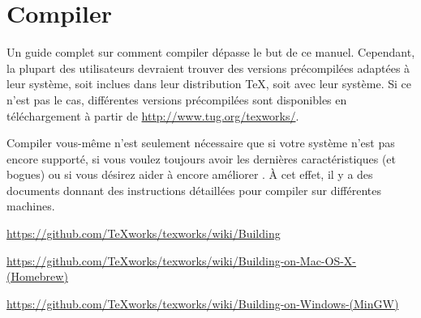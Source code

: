 
\chapter{Compiler {\Tw}}
\label{sec.compiling}

Un guide complet sur comment compiler \Tw{} dépasse le but de ce manuel. Cependant, la plupart des utilisateurs devraient trouver des versions précompilées adaptées à leur système, soit inclues dans leur distribution \TeX, soit avec leur système. Si ce n'est pas le cas, différentes versions précompilées sont disponibles en téléchargement à partir de \url{http://www.tug.org/texworks/}.

Compiler \Tw{} vous-même n'est seulement nécessaire que si votre système n'est pas encore supporté, si vous voulez toujours avoir les dernières caractéristiques (et bogues) ou si vous  désirez aider à encore améliorer \Tw. À cet effet, il y a des documents donnant des instructions détaillées pour compiler \Tw{} sur différentes machines.

\begin{OSLinux}
\noindent\url{https://github.com/TeXworks/texworks/wiki/Building} \\
\end{OSLinux}

\begin{OSMac}
\noindent\raggedright\url{https://github.com/TeXworks/texworks/wiki/Building-on-Mac-OS-X-(Homebrew)} \\
\end{OSMac}

\begin{OSWindows}
\noindent\raggedright\url{https://github.com/TeXworks/texworks/wiki/Building-on-Windows-(MinGW)} \\
\end{OSWindows}

